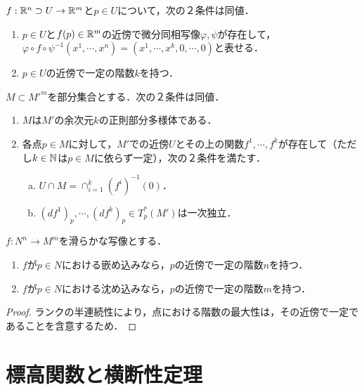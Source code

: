 \documentclass[uplatex,dvipdfmx]{jsreport}
\begin{document}
\begin{theorem}[階数一定定理]
    $f:\mathbb{R}^n\supset U\to\mathbb{R}^m$と$p\in U$について，次の２条件は同値．
    \begin{enumerate}
        \item $p\in U$と$f(p)\in\mathbb{R}^m$の近傍で微分同相写像$\varphi,\psi$が存在して，$\varphi\circ f\circ\psi^{-1}(x^1,\cdots,x^n)=(x^1,\cdots,x^k,0,\cdots,0)$と表せる．
        \item $p\in U$の近傍で一定の階数$k$を持つ．
    \end{enumerate}
\end{theorem}

\begin{theorem}[正則部分多様体の特徴付け(松島)]
    $M\subset M'^m$を部分集合とする．次の２条件は同値．
    \begin{enumerate}
        \item $M$は$M'$の余次元$k$の正則部分多様体である．
        \item 各点$p\in M$に対して，$M'$での近傍$U$とその上の関数$f^1,\cdots,f^k$が存在して（ただし$k\in\mathbb{N}$は$p\in M$に依らず一定），次の２条件を満たす．
        \begin{enumerate}[(a)]
            \item $U\cap M=\cap_{i=1}^k(f^i)^{-1}(0)$．
            \item $(df^1)_p,\cdots,(df^k)_p\in T^*_p(M')$は一次独立．
        \end{enumerate}
    \end{enumerate}
\end{theorem}

\begin{theorem}
    $f:N^n\to M^m$を滑らかな写像とする．
    \begin{enumerate}
        \item $f$が$p\in N$における嵌め込みなら，$p$の近傍で一定の階数$n$を持つ．
        \item $f$が$p\in N$における沈め込みなら，$p$の近傍で一定の階数$m$を持つ．
    \end{enumerate}
\end{theorem}
\begin{proof}
    ランクの半連続性により，点における階数の最大性は，その近傍で一定であることを含意するため．
\end{proof}

\section{標高関数と横断性定理}
\end{document}
